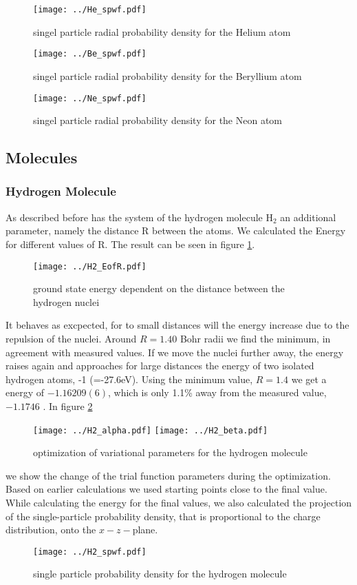 \documentclass[a4paper,10pt]{article}
\begin{document}
\begin{figure}
 \texttt{[image: ../He\_spwf.pdf]}
 \caption{singel particle radial probability density for the Helium atom}
\end{figure}

\begin{figure}
 \texttt{[image: ../Be\_spwf.pdf]}
 \caption{singel particle radial probability density for the Beryllium atom}
\end{figure}

\begin{figure}
 \texttt{[image: ../Ne\_spwf.pdf]}
 \caption{singel particle radial probability density for the Neon atom}
\end{figure}

\subsection{Molecules}
\subsubsection{Hydrogen Molecule}
As described before has the system of the hydrogen molecule $\text{H}_2$ an additional parameter, namely the distance R between the atoms. 
We calculated the Energy for different values of R. The result can be seen in figure \ref{EofR}. 
\begin{figure}[htbp]
 \label{EofR}
 \texttt{[image: ../H2\_EofR.pdf]}
 \caption{ground state energy dependent on the distance between the hydrogen nuclei}
\end{figure}
It behaves as excpected, for to small distances 
will the energy increase due to the repulsion of the nuclei. Around $R=1.40$ Bohr radii we find the minimum, in agreement with measured values. 
If we move the nuclei further away, the energy raises again and approaches for large distances the energy of two isolated hydrogen atoms, -1 (=-27.6eV).
Using the minimum value, $R=1.4$ we get a energy of $-1.16209(6)$, which is only 1.1\% away from the measured value, $-1.1746$ \cite{Moskowitz}.
In figure \ref{H2_alpha}
\begin{figure}
 \texttt{[image: ../H2\_alpha.pdf]}
 \texttt{[image: ../H2\_beta.pdf]}
 \caption{optimization of variational parameters for the hydrogen molecule}
 \label{H2_alpha}
\end{figure}
we show the change of the trial function parameters during the optimization. Based on earlier calculations we used 
starting points close to the final value. 
While calculating the energy for the final values, we also calculated the projection
of the single-particle probability density, that is proportional to the charge distribution, 
onto the $x-z-$plane. 
\begin{figure}
 \texttt{[image: ../H2\_spwf.pdf]}
 \caption{single particle probability density for the hydrogen molecule}
\end{figure}
\end{document}
